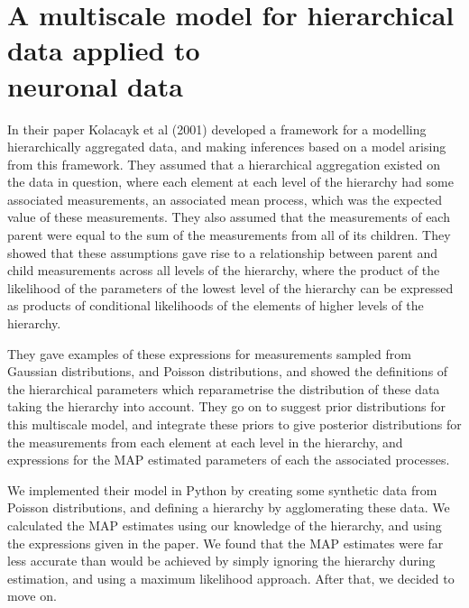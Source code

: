 \section{A multiscale model for hierarchical data applied to \\ neuronal data}
In their paper Kolacayk et al (2001) developed a framework for a modelling hierarchically aggregated data, and making inferences based on a model arising from this framework. They assumed that a hierarchical aggregation existed on the data in question, where each element at each level of the hierarchy had some associated measurements, an associated mean process, which was the expected value of these measurements. They also assumed that the measurements of each parent were equal to the sum of the measurements from all of its children. They showed that these assumptions gave rise to a relationship between parent and child measurements across all levels of the hierarchy, where the product of the likelihood of the parameters of the lowest level of the hierarchy can be expressed as products of conditional likelihoods of the elements of higher levels of the hierarchy\cite{kolacayk}.

They gave examples of these expressions for measurements sampled from Gaussian distributions, and Poisson distributions, and showed the definitions of the hierarchical parameters which reparametrise the distribution of these data taking the hierarchy into account. They go on to suggest prior distributions for this multiscale model, and integrate these priors to give posterior distributions for the measurements from each element at each level in the hierarchy, and expressions for the MAP estimated parameters of each the associated processes\cite{kolacayk}.

We implemented their model in Python by creating some synthetic data from Poisson distributions, and defining a hierarchy by agglomerating these data. We calculated the MAP estimates using our knowledge of the hierarchy, and using the expressions given in the paper. We found that the MAP estimates were far less accurate than would be achieved by simply ignoring the hierarchy during estimation, and using a maximum likelihood approach. After that, we decided to move on.
